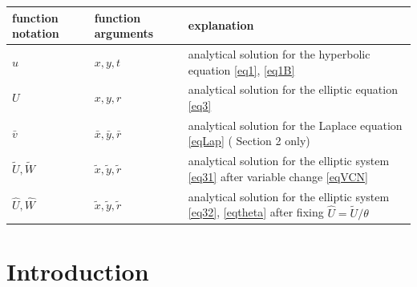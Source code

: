 \documentclass[12pt]{article}
\theoremstyle{theorem}
\theoremstyle{defi}
\begin{document}
\begin{center}
\begin{table}[ht]
		\begin{tabular}{|C{1.6cm}|C{1.9cm}|C{7.3cm}|}
   			\hline 
			\hline 
    function notation  & function arguments   &  explanation  \\
               	 \hline 
    $u$          & $x,y,t$                            &  analytical solution for the hyperbolic equation \eqref{eq1}, \eqref{eq1B} \\
			\hline 	
      $U$        &   $x, y, r$                           & analytical solution for the elliptic equation \eqref{eq3} \\
			\hline 	
      $\bar v$        &  $\bar x, \bar y, \bar r$  & analytical solution for the Laplace equation \eqref{eqLap} ( Section 2 only)  \\
			\hline 	
     $\tilde U, \tilde W$ & $ \tilde x, \tilde y, \tilde r$  &  analytical solution for the elliptic system \eqref{eq31} after variable change \eqref{eqVCN} \\
			\hline 	
     $\widehat U, \widehat W$ & $\tilde x, \tilde y, \tilde r$  &  analytical solution for the elliptic system \eqref{eq32}, \eqref{eqtheta} after fixing $ \widehat U = \tilde U / \theta $ \\
		   \hline
	          \hline 
		\end{tabular}
\end{table}
\end{center}

\section{Introduction}
\end{document}
